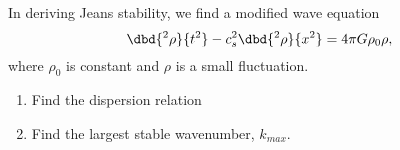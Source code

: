 In deriving Jeans stability, we find a modified wave equation
$$
\dbd{^2 \rho}{t^2} - c_s^2 \dbd{^2 \rho}{x^2} = 4 \pi G \rho_0 \rho,
$$
where $\rho_0$ is constant and $\rho$ is a small fluctuation.
\begin{enumerate}
\item Find the dispersion relation
\item Find the largest stable wavenumber, $k_{max}$.
\end{enumerate}
